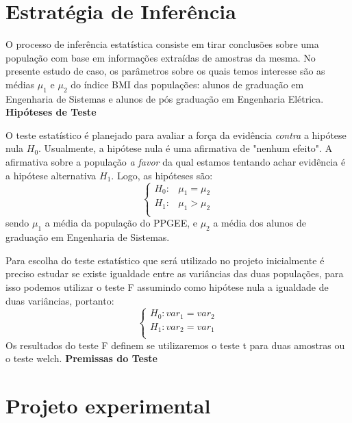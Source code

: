 \documentclass[12pt, a4paper]{article}
\begin{document}
\section{Estratégia de Inferência}
\label{sec:estrategia-inferencia}
O processo de inferência estatística consiste em tirar conclusões sobre uma população com base em informações extraídas de amostras da mesma. No presente estudo de caso, os parâmetros sobre os quais temos interesse são as médias $\mu_{1}$ e $\mu_{2}$ do índice BMI das populações: alunos de graduação em Engenharia de Sistemas e alunos de pós graduação em Engenharia Elétrica.
\newline
\newline
\textbf{Hipóteses de Teste}
\par O teste estatístico é planejado para avaliar a força da evidência \textit{contra} a hipótese nula $H_{0}$. Usualmente, a hipótese nula é uma afirmativa de "nenhum efeito". A afirmativa sobre a população \textit{a favor} da qual estamos tentando achar evidência é a hipótese alternativa $H_{1}$. Logo, as hipóteses são:
\begin{equation}
\left \{
\begin{array}{cc}
H_{0}: & \mu_{1} = \mu_{2} \\
H_{1}: & \mu_{1} > \mu_{2} \\
\end{array}
\right.
\end{equation}
\newline sendo $\mu_{1}$ a média da população do PPGEE, e $\mu_{2}$ a média dos alunos de graduação em Engenharia de Sistemas.
\par Para escolha do teste estatístico que será utilizado no projeto inicialmente é preciso estudar se existe igualdade entre as variâncias das duas populações, para isso podemos utilizar o teste F assumindo como hipótese nula a igualdade de duas variâncias, portanto:
\begin{equation}
\left \{
\begin{array}{cc}
H_{0}: var_{1} = var_{2} \\
H_{1}: var_{2} = var_{1} \\
\end{array}
\right.
\end{equation}
Os resultados do teste F definem se utilizaremos o teste t para duas amostras ou o teste welch.
\newline
\textbf{Premissas do Teste}


\section{Projeto experimental}
\label{sec:projeto-experimental}
\end{document}
